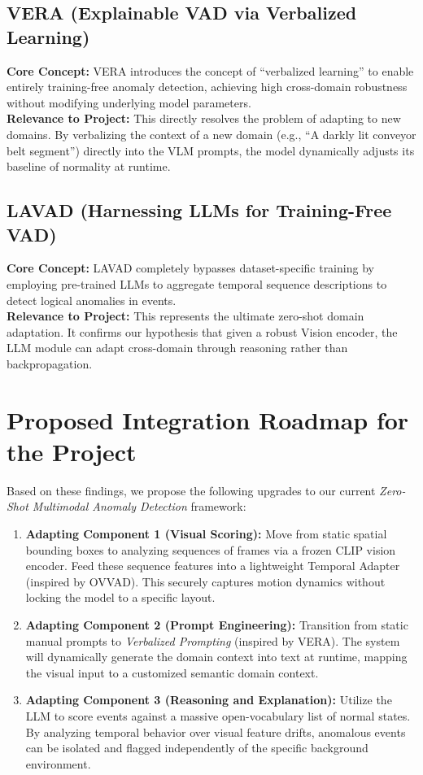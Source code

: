 \documentclass[12pt, a4paper]{article}
\begin{document}
\subsection{VERA (Explainable VAD via Verbalized Learning)}
\textbf{Core Concept:} VERA introduces the concept of ``verbalized learning'' to enable entirely training-free anomaly detection, achieving high cross-domain robustness without modifying underlying model parameters.\\
\textbf{Relevance to Project:} This directly resolves the problem of adapting to new domains. By verbalizing the context of a new domain (e.g., ``A darkly lit conveyor belt segment'') directly into the VLM prompts, the model dynamically adjusts its baseline of normality at runtime.

\subsection{LAVAD (Harnessing LLMs for Training-Free VAD)}
\textbf{Core Concept:} LAVAD completely bypasses dataset-specific training by employing pre-trained LLMs to aggregate temporal sequence descriptions to detect logical anomalies in events.\\
\textbf{Relevance to Project:} This represents the ultimate zero-shot domain adaptation. It confirms our hypothesis that given a robust Vision encoder, the LLM module can adapt cross-domain through reasoning rather than backpropagation.

\section{Proposed Integration Roadmap for the Project}

Based on these findings, we propose the following upgrades to our current \textit{Zero-Shot Multimodal Anomaly Detection} framework:

\begin{enumerate}
    \item \textbf{Adapting Component 1 (Visual Scoring):} Move from static spatial bounding boxes to analyzing sequences of frames via a frozen CLIP vision encoder. Feed these sequence features into a lightweight Temporal Adapter (inspired by OVVAD). This securely captures motion dynamics without locking the model to a specific layout.
    \item \textbf{Adapting Component 2 (Prompt Engineering):} Transition from static manual prompts to \textit{Verbalized Prompting} (inspired by VERA). The system will dynamically generate the domain context into text at runtime, mapping the visual input to a customized semantic domain context.
    \item \textbf{Adapting Component 3 (Reasoning and Explanation):} Utilize the LLM to score events against a massive open-vocabulary list of normal states. By analyzing temporal behavior over visual feature drifts, anomalous events can be isolated and flagged independently of the specific background environment.
\end{enumerate}
\end{document}
